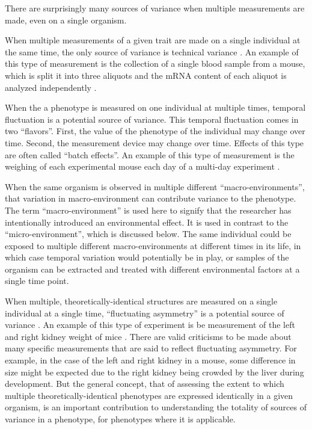There are surprisingly many sources of variance when multiple measurements are made, even on a single organism. %

When multiple measurements of a given trait are made on a single individual at the same time, the only source of variance is technical variance \citep{Ronnegard2011a}.
An example of this type of measurement is the collection of a single blood sample from a mouse, which is split it into three aliquots and the mRNA content of each aliquot is analyzed independently \citep{Marioni2008}.

When the a phenotype is measured on one individual at multiple times, temporal fluctuation is a potential source of variance.
This temporal fluctuation comes in two ``flavors''.
First, the value of the phenotype of the individual may change over time.
Second, the measurement device may change over time.
Effects of this type are often called ``batch effects''.
An example of this type of measurement is the weighing of each experimental mouse each day of a multi-day experiment \citep{Gray2015}.

When the same organism is observed in multiple different ``macro-environments'', that variation in macro-environment can contribute variance to the phenotype.
The term ``macro-environment'' is used here to signify that the researcher has intentionally introduced an environmental effect.
It is used in contrast to the ``micro-environment'', which is discussed below.
The same individual could be exposed to multiple different macro-environments at different times in its life, in which case temporal variation would potentially be in play, or samples of the organism can be extracted and treated with different environmental factors at a single time point.

When multiple, theoretically-identical structures are measured on a single individual at a single time, ``fluctuating asymmetry'' is a potential source of variance \citep{Palmer1986}.
An example of this type of experiment is be measurement of the left and right kidney weight of mice \citep{Leamy2000,Leamy2002}.
There are valid criticisms to be made about many specific measurements that are said to reflect fluctuating asymmetry.
For example, in the case of the left and right kidney in a mouse, some difference in size might be expected due to the right kidney being crowded by the liver during development.
But the general concept, that of assessing the extent to which multiple theoretically-identical phenotypes are expressed identically in a given organism, is an important contribution to understanding the totality of sources of variance in a phenotype, for phenotypes where it is applicable.

